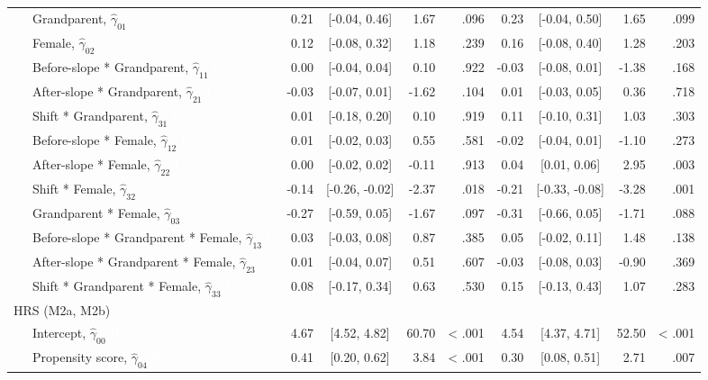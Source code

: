 \documentclass[
  english,
  man, noextraspace]{apa7}
\newenvironment{lltable}{\begin{landscape}\begin{center}\begin{ThreePartTable}}{\end{ThreePartTable}\end{center}\end{landscape}}
\begin{document}
\begin{lltable}
{\begin{longtable}{lrcrrrcrr}
\ \ \ Grandparent, $\hat{\gamma}_{01}$ \textcolor{white}{L} & 0.21 & [-0.04, 0.46] & 1.67 & .096 & 0.23 & [-0.04, 0.50] & 1.65 & .099\\
\ \ \ Female, $\hat{\gamma}_{02}$ \textcolor{white}{L} & 0.12 & [-0.08, 0.32] & 1.18 & .239 & 0.16 & [-0.08, 0.40] & 1.28 & .203\\
\ \ \ Before-slope * Grandparent, $\hat{\gamma}_{11}$ \textcolor{white}{L} & 0.00 & [-0.04, 0.04] & 0.10 & .922 & -0.03 & [-0.08, 0.01] & -1.38 & .168\\
\ \ \ After-slope * Grandparent, $\hat{\gamma}_{21}$ \textcolor{white}{L} & -0.03 & [-0.07, 0.01] & -1.62 & .104 & 0.01 & [-0.03, 0.05] & 0.36 & .718\\
\ \ \ Shift * Grandparent, $\hat{\gamma}_{31}$ \textcolor{white}{L} & 0.01 & [-0.18, 0.20] & 0.10 & .919 & 0.11 & [-0.10, 0.31] & 1.03 & .303\\
\ \ \ Before-slope * Female, $\hat{\gamma}_{12}$ \textcolor{white}{L} & 0.01 & [-0.02, 0.03] & 0.55 & .581 & -0.02 & [-0.04, 0.01] & -1.10 & .273\\
\ \ \ After-slope * Female, $\hat{\gamma}_{22}$ \textcolor{white}{L} & 0.00 & [-0.02, 0.02] & -0.11 & .913 & 0.04 & [0.01, 0.06] & 2.95 & .003\\
\ \ \ Shift * Female, $\hat{\gamma}_{32}$ \textcolor{white}{L} & -0.14 & [-0.26, -0.02] & -2.37 & .018 & -0.21 & [-0.33, -0.08] & -3.28 & .001\\
\ \ \ Grandparent * Female, $\hat{\gamma}_{03}$ \textcolor{white}{L} & -0.27 & [-0.59, 0.05] & -1.67 & .097 & -0.31 & [-0.66, 0.05] & -1.71 & .088\\
\ \ \ Before-slope * Grandparent * Female, $\hat{\gamma}_{13}$ \textcolor{white}{L} & 0.03 & [-0.03, 0.08] & 0.87 & .385 & 0.05 & [-0.02, 0.11] & 1.48 & .138\\
\ \ \ After-slope * Grandparent * Female, $\hat{\gamma}_{23}$ \textcolor{white}{L} & 0.01 & [-0.04, 0.07] & 0.51 & .607 & -0.03 & [-0.08, 0.03] & -0.90 & .369\\
\ \ \ Shift * Grandparent * Female, $\hat{\gamma}_{33}$ \textcolor{white}{L} & 0.08 & [-0.17, 0.34] & 0.63 & .530 & 0.15 & [-0.13, 0.43] & 1.07 & .283\\
HRS (M2a, M2b) &  &  &  &  &  &  &  & \\
\ \ \ Intercept, $\hat{\gamma}_{00}$ \textcolor{white}{H} & 4.67 & [4.52, 4.82] & 60.70 & < .001 & 4.54 & [4.37, 4.71] & 52.50 & < .001\\
\ \ \ Propensity score, $\hat{\gamma}_{04}$ \textcolor{white}{H} & 0.41 & [0.20, 0.62] & 3.84 & < .001 & 0.30 & [0.08, 0.51] & 2.71 & .007\\

\end{longtable}}
\end{lltable}
\end{document}
